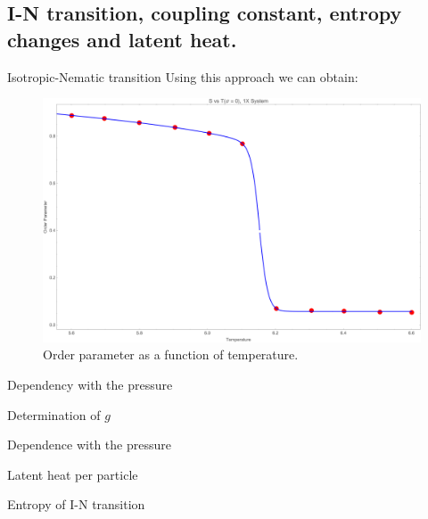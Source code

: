 \documentclass{beamer}
\begin{document}
\subsection{I-N transition, coupling constant, entropy changes and latent heat.}

\begin{frame}{Isotropic-Nematic transition}
    Using this approach we can obtain:
    \begin{figure}[]
        \centering
        \includegraphics[scale = 0.13]{Figures/SvT_Sigma0_1X.png}
        \caption{Order parameter as a function of temperature.}
        \label{fig:enter-label}
    \end{figure}
\end{frame}

\begin{frame}{Dependency with the pressure}
    
\end{frame}

\begin{frame}{Determination of $g$}
    
\end{frame}

\begin{frame}{Dependence with the pressure}
    
\end{frame}

\begin{frame}{Latent heat per particle}
    
\end{frame}

\begin{frame}{Entropy of I-N transition}
    
\end{frame}
\end{document}
